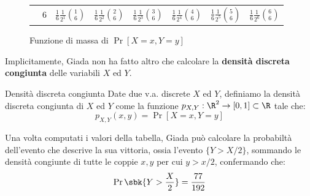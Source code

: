 \documentclass[a4paper, 12pt]{report}
\begin{document}
\begin{figure}[H]
{\begin{tabular}{cc|cccccc}
                & 6 & $\frac{1}{6} \frac{1}{2^1} \binom{1}{6}$  & $\frac{1}{6} \frac{1}{2^2} \binom{2}{6}$  & $\frac{1}{6} \frac{1}{2^3} \binom{3}{6}$  & $\frac{1}{6} \frac{1}{2^4} \binom{4}{6}$  & $\frac{1}{6} \frac{1}{2^5} \binom{5}{6}$  & $\frac{1}{6} \frac{1}{2^6} \binom{6}{6}$  \\[10pt]

            \end{tabular}
        }

        \caption{Funzione di massa di $\Pr[X = x, Y = y]$}
    \end{figure}

    Implicitamente, Giada non ha fatto altro che calcolare la \textbf{densità discreta congiunta} delle variabili $X$ ed $Y$.
    
    \begin{frameddefn}{Densità discreta congiunta}
        Date due v.a. discrete $X$ ed $Y$, definiamo la densità discreta congiunta di $X$ ed $Y$ come la funzione $p_{X,Y} : \R^2 \to [0,1] \subset \R$ tale che:
        \[p_{X,Y}(x,y) = \Pr[X=x, Y=y]\]
    \end{frameddefn}
    
    Una volta computati i valori della tabella, Giada può calcolare la probabiltà dell'evento che descrive la sua vittoria, ossia l'evento  $\{Y > X/2\}$, sommando le densità congiunte di tutte le coppie $x,y$ per cui $y > x/2$, confermando che:
    \[\Pr\sbk{Y > \frac{X}{2}} = \frac{77}{192}\]
\end{document}

